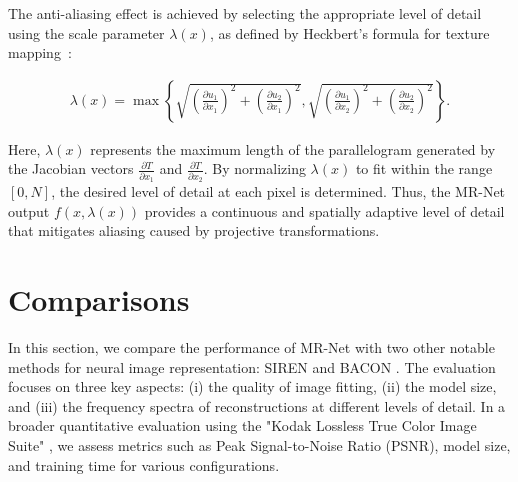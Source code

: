 The anti-aliasing effect is achieved by selecting the appropriate level of detail using the scale parameter \(\lambda(x)\), as defined by Heckbert's formula for texture mapping~\citep{heckbert1983texture}:


\begin{align}
    \lambda(x)=\max\left\{\sqrt{\left(\frac{\partial u_1}{\partial x_1}\right)^2+\left(\frac{\partial u_2}{\partial x_1}\right)^2}, \sqrt{\left(\frac{\partial u_1}{\partial x_2}\right)^2+\left(\frac{\partial u_2}{\partial x_2}\right)^2}\right\}.
\end{align}


Here, \(\lambda(x)\) represents the maximum length of the parallelogram generated by the Jacobian vectors \(\frac{\partial T}{\partial x_1}\) and \(\frac{\partial T}{\partial x_2}\). By normalizing \(\lambda(x)\) to fit within the range \([0, N]\), the desired level of detail at each pixel is determined. Thus, the MR-Net output \(f(x, \lambda(x))\) provides a continuous and spatially adaptive level of detail that mitigates aliasing caused by projective transformations.

\section{Comparisons}
\label{sec:comparison}

In this section, we compare the performance of MR-Net with two other notable methods for neural image representation: SIREN \citep{sitzmann2019siren} and BACON \citep{bacon2021}. The evaluation focuses on three key aspects: (i) the quality of image fitting, (ii) the model size, and (iii) the frequency spectra of reconstructions at different levels of detail. In a broader quantitative evaluation using the "Kodak Lossless True Color Image Suite" \citep{KodakDataset}, we assess metrics such as Peak Signal-to-Noise Ratio (PSNR), model size, and training time for various configurations.

